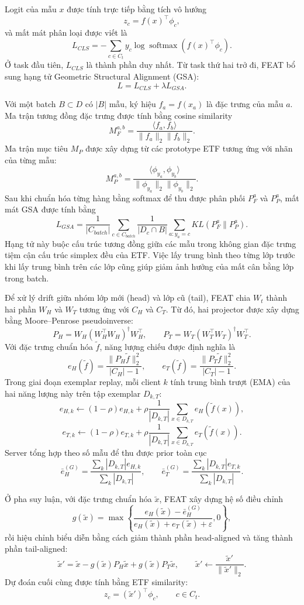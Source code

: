 Logit của mẫu $x$ được tính trực tiếp bằng tích vô hướng
\[
z_c = f(x)^{\top} \phi_c,
\]
và mất mát phân loại được viết là
\[
L_{CLS} = - \sum_{c \in C_t} y_c \log \operatorname{softmax}(f(x)^{\top} \phi_c).
\]
Ở task đầu tiên, $L_{CLS}$ là thành phần duy nhất. Từ task thứ hai trở đi, FEAT bổ sung hạng tử Geometric Structural Alignment (GSA):
\[
L = L_{CLS} + \lambda L_{GSA}.
\]

Với một batch $B \subset D$ có $|B|$ mẫu, ký hiệu $f_a = f(x_a)$ là đặc trưng của mẫu $a$. Ma trận tương đồng đặc trưng được tính bằng cosine similarity
\[
M_F^{a,b} = \frac{\langle f_a, f_b \rangle}{\|f_a\|_2 \|f_b\|_2}.
\]
Ma trận mục tiêu $M_P$ được xây dựng từ các prototype ETF tương ứng với nhãn của từng mẫu:
\[
M_P^{a,b} = \frac{\langle \phi_{y_a}, \phi_{y_b} \rangle}{\|\phi_{y_a}\|_2 \|\phi_{y_b}\|_2}.
\]
Sau khi chuẩn hóa từng hàng bằng softmax để thu được phân phối $P_F^a$ và $P_P^a$, mất mát GSA được tính bằng
\[
L_{GSA} = \frac{1}{|C_{batch}|} \sum_{c \in C_{batch}} \frac{1}{|D_c \cap B|} \sum_{a: y_a = c} KL(P_F^a \| P_P^a).
\]
Hạng tử này buộc cấu trúc tương đồng giữa các mẫu trong không gian đặc trưng tiệm cận cấu trúc simplex đều của ETF. Việc lấy trung bình theo từng lớp trước khi lấy trung bình trên các lớp cũng giúp giảm ảnh hưởng của mất cân bằng lớp trong batch.

Để xử lý drift giữa nhóm lớp mới (head) và lớp cũ (tail), FEAT chia $W_t$ thành hai phần $W_H$ và $W_T$ tương ứng với $C_H$ và $C_T$. Từ đó, hai projector được xây dựng bằng Moore--Penrose pseudoinverse:
\[
P_H = W_H (W_H^{\top} W_H)^{\dagger} W_H^{\top}, \qquad
P_T = W_T (W_T^{\top} W_T)^{\dagger} W_T^{\top}.
\]
Với đặc trưng chuẩn hóa $\tilde f$, năng lượng chiếu được định nghĩa là
\[
e_H(\tilde f) = \frac{\|P_H \tilde f\|_2^2}{|C_H|-1}, \qquad
e_T(\tilde f) = \frac{\|P_T \tilde f\|_2^2}{|C_T|-1}.
\]
Trong giai đoạn exemplar replay, mỗi client $k$ tính trung bình trượt (EMA) của hai năng lượng này trên tập exemplar $D_{k,T}$:
\[
e_{H,k} \leftarrow (1-\rho)e_{H,k} + \rho\frac{1}{|D_{k,T}|}\sum_{x \in D_{k,T}} e_H(\tilde f(x)),
\]
\[
e_{T,k} \leftarrow (1-\rho)e_{T,k} + \rho\frac{1}{|D_{k,T}|}\sum_{x \in D_{k,T}} e_T(\tilde f(x)).
\]
Server tổng hợp theo số mẫu để thu được prior toàn cục
\[
\bar e_H^{(G)} = \frac{\sum_k |D_{k,T}| e_{H,k}}{\sum_k |D_{k,T}|}, \qquad
\bar e_T^{(G)} = \frac{\sum_k |D_{k,T}| e_{T,k}}{\sum_k |D_{k,T}|}.
\]

Ở pha suy luận, với đặc trưng chuẩn hóa $\tilde x$, FEAT xây dựng hệ số điều chỉnh
\[
g(\tilde x) = \max \left\{ \frac{e_H(\tilde x) - \bar e_H^{(G)}}{e_H(\tilde x) + e_T(\tilde x) + \varepsilon}, 0 \right\},
\]
rồi hiệu chỉnh biểu diễn bằng cách giảm thành phần head-aligned và tăng thành phần tail-aligned:
\[
\tilde x' = \tilde x - g(\tilde x) P_H \tilde x + g(\tilde x) P_T \tilde x,
\qquad
\tilde x' \leftarrow \frac{\tilde x'}{\|\tilde x'\|_2}.
\]
Dự đoán cuối cùng được tính bằng ETF similarity:
\[
z_c = (\tilde x')^{\top} \phi_c, \qquad c \in C_t.
\]

